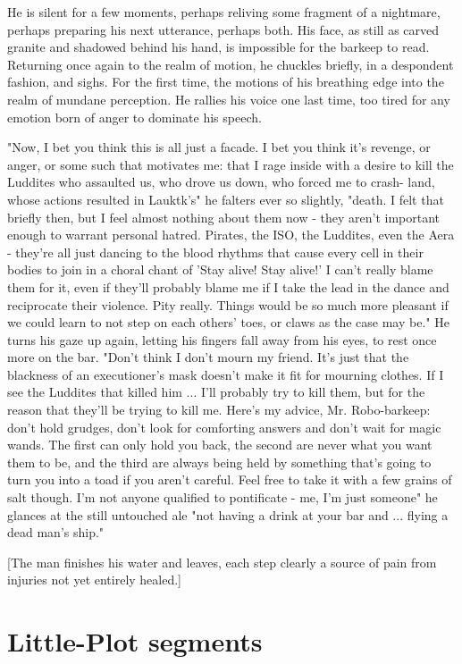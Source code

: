 He is silent for a few moments, perhaps reliving some fragment of a
nightmare, perhaps preparing his next utterance, perhaps both.  His
face, as still as carved granite and shadowed behind his hand, is
impossible for the barkeep to read. Returning once again to the realm
of motion, he chuckles briefly, in a despondent fashion, and
sighs. For the first time, the motions of his breathing edge into the
realm of mundane perception. He rallies his voice one last time, too
tired for any emotion born of anger to dominate his speech.

"Now, I bet you think this is all just a facade. I bet you think it's
revenge, or anger, or some such that motivates me: that I rage inside
with a desire to kill the Luddites who assaulted us, who drove us
down, who forced me to crash- land, whose actions resulted in
Lauktk's" he falters ever so slightly, "death. I felt that briefly
then, but I feel almost nothing about them now - they aren't important
enough to warrant personal hatred. Pirates, the ISO, the Luddites,
even the Aera - they're all just dancing to the blood rhythms that
cause every cell in their bodies to join in a choral chant of 'Stay
alive! Stay alive!' I can't really blame them for it, even if they'll
probably blame me if I take the lead in the dance and reciprocate
their violence. Pity really. Things would be so much more pleasant if
we could learn to not step on each others' toes, or claws as the case
may be." He turns his gaze up again, letting his fingers fall away
from his eyes, to rest once more on the bar. "Don't think I don't
mourn my friend. It's just that the blackness of an executioner's mask
doesn't make it fit for mourning clothes. If I see the Luddites that
killed him ... I'll probably try to kill them, but for the reason that
they'll be trying to kill me.  Here's my advice, Mr. Robo-barkeep:
don't hold grudges, don't look for comforting answers and don't wait
for magic wands. The first can only hold you back, the second are
never what you want them to be, and the third are always being held by
something that's going to turn you into a toad if you aren't
careful. Feel free to take it with a few grains of salt though. I'm
not anyone qualified to pontificate - me, I'm just someone" he glances
at the still untouched ale "not having a drink at your bar and
... flying a dead man's ship."

[The man finishes his water and leaves, each step clearly a source of
pain from injuries not yet entirely healed.]

\section{Little-Plot segments}
